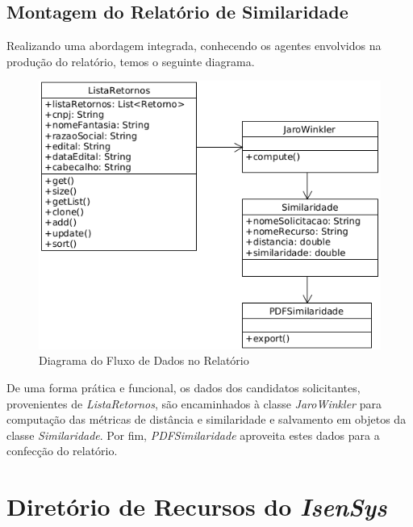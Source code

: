 \documentclass[
	12pt,			%
	openright,		%
	oneside,	
	a4paper,		%
	english,		%
	brazil			%
]{abntex2/abntex2}  %
\begin{document}
			\subsection{Montagem do Relatório de Similaridade}
			
				Realizando uma abordagem integrada, conhecendo os agentes envolvidos na produção do relatório, temos o seguinte diagrama.
				
				\begin{figure}[H]
					\begin{center}
						
						\caption{Diagrama do Fluxo de Dados no Relatório}
						\label{jaro-winkler-report-uml}
						
						\includegraphics[scale=0.6]{img/jaro-winkler-uml}
						
					\end{center}
				\end{figure}
				
				De uma forma prática e funcional, os dados dos candidatos solicitantes, provenientes de \textit{ListaRetornos}, são encaminhados à classe \textit{JaroWinkler} para computação das métricas de distância e similaridade e salvamento em objetos da classe \textit{Similaridade}. Por fim, \textit{PDFSimilaridade} aproveita estes dados para a confecção do relatório.

		\section{Diretório de Recursos do \textit{IsenSys}} \label{recursos}
		
\end{document}
